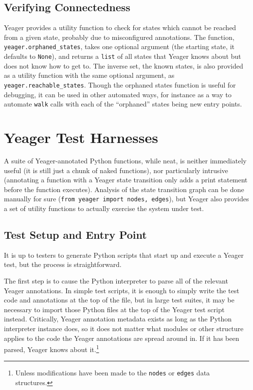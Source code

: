 \subsection{Verifying Connectedness}
Yeager provides a utility function to check for states which cannot be reached from a given state, probably due to misconfigured annotations. The function, \texttt{yeager.orphaned\_states}, takes one optional argument (the starting state, it defaults to \texttt{None}), and returns a \texttt{list} of all states that Yeager knows about but does not know how to get to. The inverse set, the known states, is also provided as a utility function with the same optional argument, as \\\texttt{yeager.reachable\_states}. Though the orphaned states function is useful for debugging, it can be used in other automated ways, for instance as a way to automate \texttt{walk} calls with each of the ``orphaned'' states being new entry points.

\section{Yeager Test Harnesses}
A suite of Yeager-annotated Python functions, while neat, is neither immediately useful (it is still just a chunk of naked functions), nor particularly intrusive (annotating a function with a Yeager state transition only adds a print statement before the function executes). Analysis of the state transition graph can be done manually for sure (\texttt{from yeager import nodes, edges}), but Yeager also provides a set of utility functions to actually exercise the system under test.

\subsection{Test Setup and Entry Point}
It is up to testers to generate Python scripts that start up and execute a Yeager test, but the process is straightforward.

The first step is to cause the Python interpreter to parse all of the relevant Yeager annotations. In simple test scripts, it is enough to simply write the test code and annotations at the top of the file, but in large test suites, it may be necessary to import those Python files at the top of the Yeager test script instead. Critically, Yeager annotation metadata exists as long as the Python interpreter instance does, so it does not matter what modules or other structure applies to the code the Yeager annotations are spread around in. If it has been parsed, Yeager knows about it.\footnote{Unless modifications have been made to the \texttt{nodes} or \texttt{edges} data structures.}

